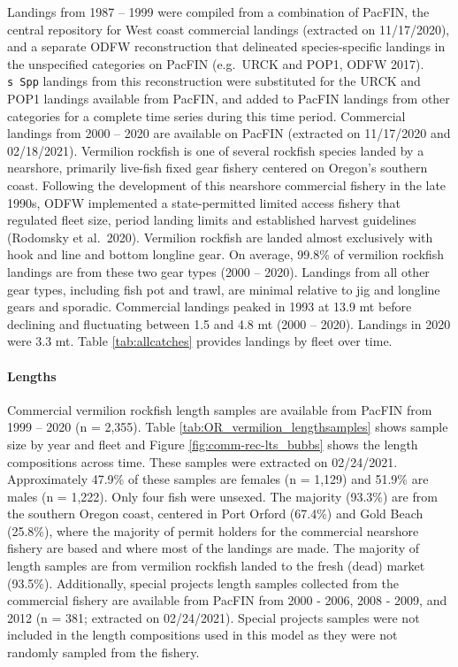 \documentclass[11pt,
  english,
  a4paper,
]{article}
\begin{document}
Landings from 1987 -- 1999 were compiled from a combination of PacFIN, the central repository for West coast commercial landings (extracted on 11/17/2020), and a separate ODFW reconstruction that delineated species-specific landings in the unspecified categories on PacFIN (e.g.~URCK and POP1, ODFW 2017). \texttt{s\ Spp} landings from this reconstruction were substituted for the URCK and POP1 landings available from PacFIN, and added to PacFIN landings from other categories for a complete time series during this time period. Commercial landings from 2000 -- 2020 are available on PacFIN (extracted on 11/17/2020 and 02/18/2021). Vermilion rockfish is one of several rockfish species landed by a nearshore, primarily live-fish fixed gear fishery centered on Oregon's southern coast. Following the development of this nearshore commercial fishery in the late 1990s, ODFW implemented a state-permitted limited access fishery that regulated fleet size, period landing limits and established harvest guidelines (Rodomsky et al.~2020). Vermilion rockfish are landed almost exclusively with hook and line and bottom longline gear. On average, 99.8\% of vermilion rockfish landings are from these two gear types (2000 -- 2020). Landings from all other gear types, including fish pot and trawl, are minimal relative to jig and longline gears and sporadic. Commercial landings peaked in 1993 at 13.9 mt before declining and fluctuating between 1.5 and 4.8 mt (2000 -- 2020). Landings in 2020 were 3.3 mt. Table \ref{tab:allcatches} provides landings by fleet over time.

\leavevmode\tagmcend\tagstructend\par


\hypertarget{lengths}{%
\paragraph{Lengths}\label{lengths}}

\leavevmode\tagmcend\tagstructend


Commercial vermilion rockfish length samples are available from PacFIN from 1999 -- 2020 (n = 2,355). Table \ref{tab:OR_vermilion_lengthsamples} shows sample size by year and fleet and Figure \ref{fig:comm-rec-lts_bubbs} shows the length compositions across time. These samples were extracted on 02/24/2021. Approximately 47.9\% of these samples are females (n = 1,129) and 51.9\% are males (n = 1,222). Only four fish were unsexed. The majority (93.3\%) are from the southern Oregon coast, centered in Port Orford (67.4\%) and Gold Beach (25.8\%), where the majority of permit holders for the commercial nearshore fishery are based and where most of the landings are made. The majority of length samples are from vermilion rockfish landed to the fresh (dead) market (93.5\%). Additionally, special projects length samples collected from the commercial fishery are available from PacFIN from 2000 - 2006, 2008 - 2009, and 2012 (n = 381; extracted on 02/24/2021). Special projects samples were not included in the length compositions used in this model as they were not randomly sampled from the fishery.
\end{document}
